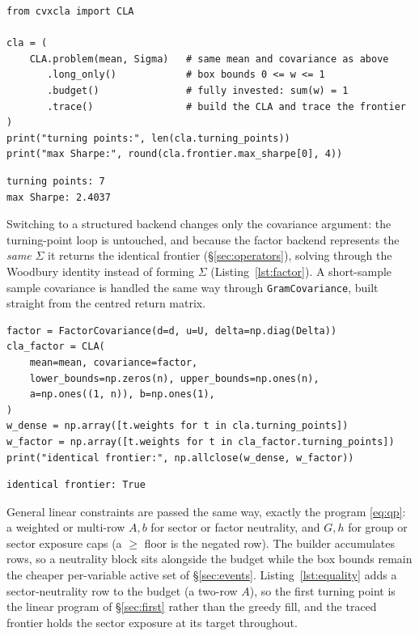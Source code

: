 \documentclass[11pt]{article}
\newcommand{\Sig}{\Sigma}
\begin{document}
\begin{lstlisting}[style=pyin,caption={The same problem assembled through the
fluent builder; \texttt{.trace()} returns the identical \texttt{CLA}.},label={lst:builder}]
from cvxcla import CLA

cla = (
    CLA.problem(mean, Sigma)   # same mean and covariance as above
       .long_only()            # box bounds 0 <= w <= 1
       .budget()               # fully invested: sum(w) = 1
       .trace()                # build the CLA and trace the frontier
)
print("turning points:", len(cla.turning_points))
print("max Sharpe:", round(cla.frontier.max_sharpe[0], 4))
\end{lstlisting}

\begin{lstlisting}[style=pyout]
turning points: 7
max Sharpe: 2.4037
\end{lstlisting}

Switching to a structured backend changes only the covariance argument: the
turning-point loop is untouched, and because the factor backend represents the
\emph{same} $\Sig$ it returns the identical frontier (\S\ref{sec:operators}),
solving through the Woodbury identity instead of forming $\Sig$
(Listing~\ref{lst:factor}). A short-sample sample covariance is handled the same
way through \texttt{GramCovariance}, built straight from the centred return matrix.

\begin{lstlisting}[style=pyin,caption={The factor backend traces the identical
frontier without ever forming the $n\times n$ matrix.},label={lst:factor}]
factor = FactorCovariance(d=d, u=U, delta=np.diag(Delta))
cla_factor = CLA(
    mean=mean, covariance=factor,
    lower_bounds=np.zeros(n), upper_bounds=np.ones(n),
    a=np.ones((1, n)), b=np.ones(1),
)
w_dense = np.array([t.weights for t in cla.turning_points])
w_factor = np.array([t.weights for t in cla_factor.turning_points])
print("identical frontier:", np.allclose(w_dense, w_factor))
\end{lstlisting}

\begin{lstlisting}[style=pyout]
identical frontier: True
\end{lstlisting}

General linear constraints are passed the same way, exactly the program
\eqref{eq:qp}: a weighted or multi-row $A,b$ for sector or factor neutrality, and
$G,h$ for group or sector exposure caps (a $\ge$ floor is the negated row). The
builder accumulates rows, so a neutrality block sits alongside the budget while the
box bounds remain the cheaper per-variable active set of \S\ref{sec:events}.
Listing~\ref{lst:equality} adds a sector-neutrality row to the budget (a two-row
$A$), so the first turning point is the linear program of \S\ref{sec:first} rather
than the greedy fill, and the traced frontier holds the sector exposure at its
target throughout.
\end{document}
